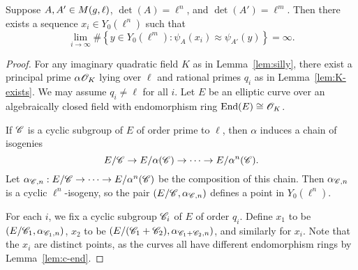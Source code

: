 \documentclass{amsart}
\begin{document}
\begin{lemma}\label{lem:lim-degree}
  Suppose $A,A' \in M(g,\ell)$, $\det(A) = \ell^n$, and $\det(A') = \ell^m$.
  Then there exists a sequence $x_i \in Y_0(\ell^n)$ such that
  \[
    \lim_{i \to \infty}\#\left\{ y \in Y_0(\ell^m) \colon \psi_A(x_i) \approx \psi_{A'}(y) \right\} = \infty.
  \]
\end{lemma}
\begin{proof}
  For any imaginary quadratic field $K$ as in Lemma~\ref{lem:silly}, there exist a principal prime $\alpha\mathscr{O}_K$ lying over $\ell$ and rational primes $q_i$ as in Lemma~\ref{lem:K-exists}. We may assume $q_i \neq \ell$ for all $i$. Let $E$ be an elliptic curve over an algebraically closed field with endomorphism ring $\operatorname{End}(E) \cong \mathscr{O}_K$.

  If $\mathscr{C}$ is a cyclic subgroup of $E$ of order prime to $\ell$, then $\alpha$ induces a chain of isogenies
  \[
    E/\mathscr{C} \to E/\alpha(\mathscr{C}) \to \cdots \to E/\alpha^n(\mathscr{C}).
  \]
  Let $\alpha_{\mathscr{C},n}: E/\mathscr{C} \to \cdots \to E/\alpha^n(\mathscr{C})$ be the composition of this chain. Then $\alpha_{\mathscr{C},n}$ is a cyclic $\ell^n$-isogeny, so the pair $(E/\mathscr{C},\alpha_{\mathscr{C},n})$ defines a point in $Y_0(\ell^n)$.

    For each $i$, we fix a cyclic subgroup $\mathscr{C}_i$ of $E$ of order $q_i$. Define $x_1$ to be $(E/\mathscr{C}_1,\alpha_{\mathscr{C}_1,n})$, $x_2$ to be $(E/(\mathscr{C}_1 + \mathscr{C}_2), \alpha_{\mathscr{C}_1 + \mathscr{C}_2,n})$, and similarly for $x_i$. Note that the $x_i$ are distinct points, as the curves all have different endomorphism rings by Lemma~\ref{lem:c-end}.


\end{proof}
\end{document}
